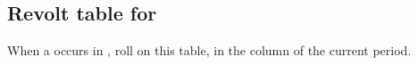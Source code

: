 \clearpage







\subsection{Revolt table for \ANG}

\aparag When a \REVOLT occurs in \ANG, roll on this table, in the column of
the current period.

